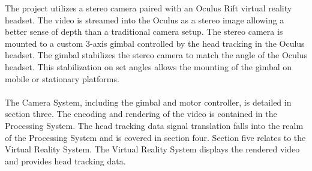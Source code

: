 The project utilizes a stereo camera paired with an Oculus Rift virtual reality headset. The video is streamed into the Oculus as a stereo image allowing a better sense of depth than a traditional camera setup.  The stereo camera is mounted to a custom 3-axis gimbal controlled by the head tracking in the Oculus headset. The gimbal stabilizes the stereo camera to match the angle of the Oculus headset. This stabilization on set angles allows the mounting of the gimbal on mobile or stationary platforms.
\\\\
The Camera System, including the gimbal and motor controller, is detailed in section three. The encoding and rendering of the video is contained in the Processing System. The head tracking data signal translation falls into the realm of the Processing System and is covered in section four. Section five relates to the Virtual Reality System. The Virtual Reality System displays the rendered video and provides head tracking data.